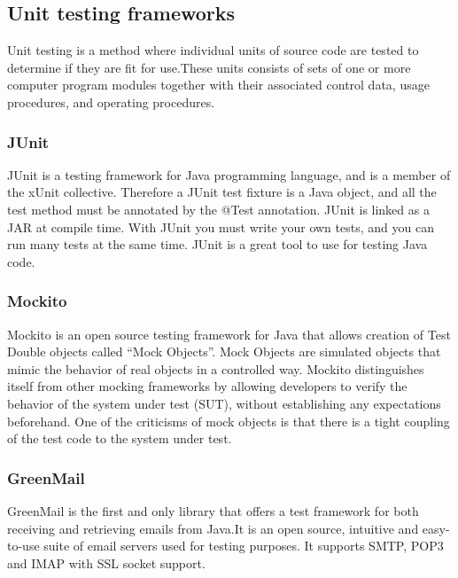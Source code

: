 \subsection{Unit testing frameworks}

Unit testing is a method where individual units of source code are tested to determine if they are fit for use.These units consists of sets of one or more computer program modules together with their associated control data, usage procedures, and operating procedures.

\subsubsection{JUnit}
JUnit is a testing framework for Java programming language, and is a member of the xUnit collective. Therefore a JUnit test fixture is a Java object, and all the test method must be annotated by the @Test annotation. JUnit is linked as a JAR at compile time. With JUnit you must write your own tests, and you can run many tests at the same time. JUnit is a great tool to use for testing Java code.

\subsubsection{Mockito}
Mockito is an open source testing framework for Java that allows creation of Test Double objects called “Mock Objects”. Mock Objects are simulated objects that mimic the behavior of real objects in a controlled way.
\newline
\newline
Mockito distinguishes itself from other mocking frameworks by allowing developers to verify the behavior of the system under test (SUT), without establishing any expectations beforehand.
One of the criticisms of mock objects is that there is a tight coupling of the test code to the system under test.

\subsubsection{GreenMail}
GreenMail is the first and only library that offers a test framework for both receiving and retrieving emails from Java.It is an open source, intuitive and easy-to-use suite of email servers used for testing purposes. It supports SMTP, POP3 and IMAP with SSL socket support.

